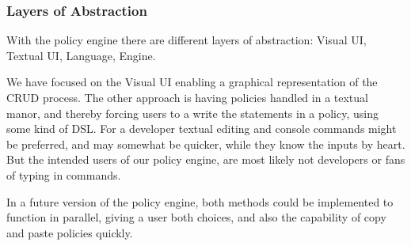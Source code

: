\subsubsection{Layers of Abstraction}

With the policy engine there are different layers of abstraction: Visual UI, Textual UI, Language, Engine.

We have focused on the Visual UI enabling a graphical representation of the CRUD process. The other approach is having policies handled in a textual manor, and thereby forcing users to a write the statements in a policy, using some kind of DSL. For a developer textual editing and console commands might be preferred, and may somewhat be quicker, while they know the inputs by heart. But the intended users of our policy engine, are most likely not developers or fans of typing in commands.

In a future version of the policy engine, both methods could be implemented to function in parallel, giving a user both choices, and also the capability of copy and paste policies quickly.